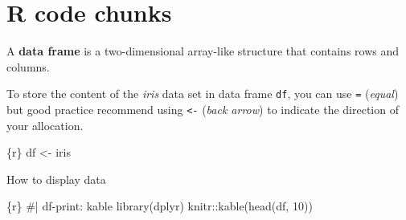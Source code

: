 \documentclass[
  letterpaper,
  DIV=11,
  numbers=noendperiod,
  oneside]{scrreprt}
\newenvironment{Shaded}{\begin{snugshade}}{\end{snugshade}}
\newcommand{\CommentTok}[1]{\textcolor[rgb]{0.37,0.37,0.37}{#1}}
\newcommand{\DecValTok}[1]{\textcolor[rgb]{0.68,0.00,0.00}{#1}}
\newcommand{\FunctionTok}[1]{\textcolor[rgb]{0.28,0.35,0.67}{#1}}
\newcommand{\InformationTok}[1]{\textcolor[rgb]{0.37,0.37,0.37}{#1}}
\newcommand{\NormalTok}[1]{\textcolor[rgb]{0.00,0.23,0.31}{#1}}
\newcommand{\OtherTok}[1]{\textcolor[rgb]{0.00,0.23,0.31}{#1}}
\newcommand{\SpecialCharTok}[1]{\textcolor[rgb]{0.37,0.37,0.37}{#1}}
\begin{document}
\hypertarget{r-code-chunks}{%
\section{R code chunks}\label{r-code-chunks}}

\begin{tcolorbox}[enhanced jigsaw, colbacktitle=quarto-callout-note-color!10!white, titlerule=0mm, breakable, opacityback=0, opacitybacktitle=0.6, left=2mm, coltitle=black, colback=white, title=\textcolor{quarto-callout-note-color}{\faInfo}\hspace{0.5em}{Note}, rightrule=.15mm, colframe=quarto-callout-note-color-frame, toprule=.15mm, bottomtitle=1mm, toptitle=1mm, arc=.35mm, bottomrule=.15mm, leftrule=.75mm]
A \textbf{data frame} is a two-dimensional array-like structure that
contains rows and columns.
\end{tcolorbox}

To store the content of the \emph{iris} data set in data frame
\texttt{df}, you can use \texttt{=} (\emph{equal}) but good practice
recommend using \texttt{\textless{}-} (\emph{back arrow}) to indicate
the direction of your allocation.

\begin{Shaded}
\begin{Highlighting}[]
\InformationTok{\textasciigrave{}\textasciigrave{}\textasciigrave{}\{r\}}
\NormalTok{df }\OtherTok{\textless{}{-}}\NormalTok{ iris}
\InformationTok{\textasciigrave{}\textasciigrave{}\textasciigrave{}}
\end{Highlighting}
\end{Shaded}

How to display data

\begin{Shaded}
\begin{Highlighting}[]
\InformationTok{\textasciigrave{}\textasciigrave{}\textasciigrave{}\{r\}}
\CommentTok{\#| df{-}print: kable}
\FunctionTok{library}\NormalTok{(dplyr)}
\NormalTok{knitr}\SpecialCharTok{::}\FunctionTok{kable}\NormalTok{(}\FunctionTok{head}\NormalTok{(df, }\DecValTok{10}\NormalTok{))}
\InformationTok{\textasciigrave{}\textasciigrave{}\textasciigrave{}}
\end{Highlighting}
\end{Shaded}
\end{document}
